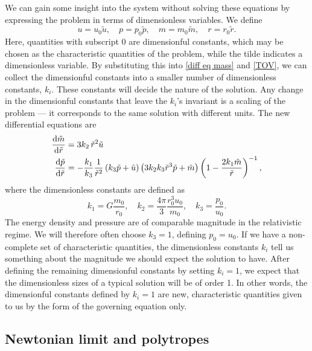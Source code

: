 We can gain some insight into the system without solving these equations by expressing the problem in terms of dimensionless variables.
We define
%
\begin{equation}
    u = u_0 \tilde u, \quad 
    p = p_0 \tilde p, \quad 
    m = m_0 \tilde m, \quad 
    r = r_0 \tilde r.
\end{equation}
%
Here, quantities with subscript $0$ are dimensionful constants, which may be chosen as the characteristic quantities of the problem, while the tilde indicates a dimensionless variable.
By substituting this into \autoref{diff eq mass} and \autoref{TOV}, we can collect the dimensionful constants into a smaller number of dimensionless constants, $k_i$.
These constants will decide the nature of the solution.
Any change in the dimensionful constants that leave the $k_i$'s invariant is a scaling of the problem --- it corresponds to the same solution with different units.
The new differential equations are
%
\begin{align}
    \label{mass relation dimensionless}
    \odv{ \tilde m}{\tilde r} & = 3 k_2\, \tilde r^2 \tilde u \\
    \label{TOV dimensionless}
    \odv{\tilde p}{\tilde r} & 
    = - \frac{k_1}{k_3} \frac{1}{\tilde r^2} \left(k_3\tilde p + \tilde u\right) 
    \left(3 k_2 k_3  \tilde r^3 \tilde p + \tilde m\right) 
    \left(1 - \frac{2 k_1  \tilde m}{\tilde r}\right)^{-1},
\end{align}
%
where the dimensionless constants are defined as
%
\begin{equation}
    \label{dimensionless constants TOV}
    k_1 = G \frac{m_0}{r_0}, \quad 
    k_2 =  \frac{4 \pi}{3} \frac{r_0^3 u_0}{m_0}, \quad
    k_3 = \frac{p_0}{u_0}.
\end{equation}
%
The energy density and pressure are of comparable magnitude in the relativistic regime.
We will therefore often choose $k_3 = 1$, defining $p_0 = u_0$.
If we have a non-complete set of characteristic quantities, the dimensionless constants $k_i$ tell us something about the magnitude we should expect the solution to have.
After defining the remaining dimensionful constants by setting $k_i = 1$, we expect that the dimensionless sizes of a typical solution will be of order 1.
In other words, the dimensionful constants defined by $k_i = 1$ are new, characteristic quantities given to us by the form of the governing equation only.




\subsection{Newtonian limit and polytropes}
\label{subsection: Newtonian limit and polytropes}

